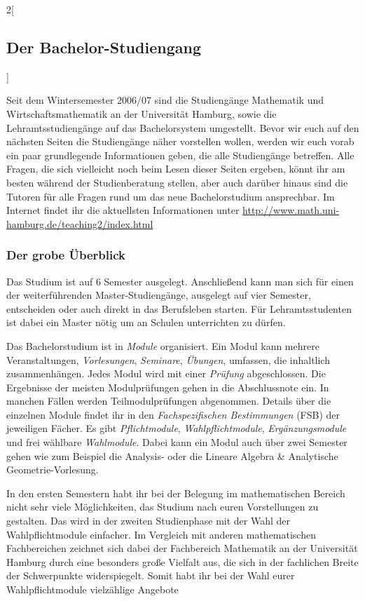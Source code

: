 \begin{multicols}{2}[\subsection{Der Bachelor-Studiengang}]

Seit dem Wintersemester 2006/07 sind die Studiengänge Mathematik und
Wirtschaftsmathematik an der Universität Hamburg, sowie die
Lehramtsstudiengänge auf das Bachelorsystem umgestellt.  Bevor wir euch auf den
nächsten Seiten die Studiengänge näher vorstellen wollen, werden wir euch vorab
ein paar grundlegende Informationen geben, die alle Studiengänge betreffen.
Alle Fragen, die sich vielleicht noch beim Lesen dieser Seiten ergeben, könnt
ihr am besten während der Studienberatung stellen, aber auch darüber hinaus
sind die Tutoren für alle Fragen rund um das neue Bachelorstudium ansprechbar.
Im Internet findet ihr die aktuellsten Informationen unter
\url{http://www.math.uni-hamburg.de/teaching2/index.html}

\subsubsection{Der grobe Überblick}

Das Studium ist auf 6 Semester ausgelegt. Anschließend kann man sich für einen
der weiterführenden Master-Studiengänge, ausgelegt auf vier Semester,
entscheiden oder auch direkt in das Berufsleben starten. Für Lehramtsstudenten
ist dabei ein Master nötig um an Schulen unterrichten zu dürfen.

Das Bachelorstudium ist in \emph{Module} organisiert. Ein Modul kann mehrere
Veranstaltungen, \emph{Vorlesungen}, \emph{Seminare}, \emph{Übungen}, umfassen,
die inhaltlich zusammenhängen.  Jedes Modul wird mit einer \emph{Prüfung}
abgeschlossen.  Die Ergebnisse der meisten Modulprüfungen gehen in die
Abschlussnote ein. In manchen Fällen werden Teilmodulprüfungen abgenommen.
Details über die einzelnen Module findet ihr in den \emph{Fachspezifischen
Bestimmungen} (FSB) der jeweiligen Fächer.  Es gibt \emph{Pflichtmodule},
\emph{Wahlpflichtmodule}, \emph{Ergänzungsmodule} und frei wählbare
\emph{Wahlmodule}.  Dabei kann ein Modul auch über zwei Semester gehen wie zum
Beispiel die Analysis- oder die Lineare Algebra \& Analytische
Geometrie-Vorlesung. 

In den ersten Semestern habt ihr bei der Belegung im mathematischen Bereich
nicht sehr viele Möglichkeiten, das Studium nach euren Vorstellungen zu
gestalten. Das wird in der zweiten Studienphase mit der Wahl der
Wahlpflichtmodule einfacher.  Im Vergleich mit anderen mathematischen
Fachbereichen zeichnet sich dabei der Fachbereich Mathematik an der Universität
Hamburg durch eine besonders große Vielfalt aus, die sich in der fachlichen
Breite der Schwerpunkte widerspiegelt. Somit habt ihr bei der Wahl eurer
Wahlpflichtmodule vielzählige Angebote


\end{multicols}
